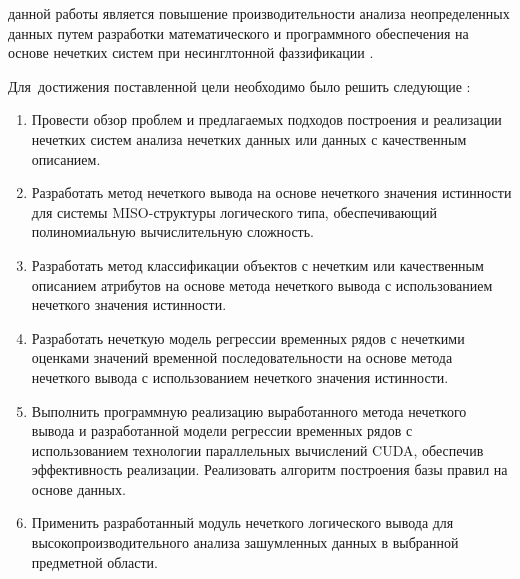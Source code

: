 \ifsynopsis
\else
\fi


{\aim} данной работы является повышение производительности анализа неопределенных данных путем разработки математического и программного обеспечения на основе нечетких систем при несинглтонной фаззификации .

Для~достижения поставленной цели необходимо было решить следующие {\tasks}:
\begin{enumerate}[beginpenalty=10000] %
  \item Провести обзор проблем и предлагаемых подходов построения и реализации нечетких систем анализа нечетких данных или данных с качественным описанием.
  \item Разработать метод нечеткого вывода на основе нечеткого значения истинности для системы MISO-структуры логического типа, обеспечивающий полиномиальную вычислительную сложность.
  \item Разработать метод классификации объектов с нечетким или качественным описанием атрибутов на основе метода нечеткого вывода с использованием нечеткого значения истинности.
  \item Разработать нечеткую модель регрессии временных рядов с нечеткими оценками значений временной последовательности на основе метода нечеткого вывода с использованием нечеткого значения истинности.
  \item Выполнить программную реализацию выработанного метода нечеткого вывода и разработанной модели регрессии временных рядов с использованием технологии параллельных вычислений CUDA, обеспечив эффективность реализации. Реализовать алгоритм построения базы правил на основе данных.
  \item Применить разработанный модуль нечеткого логического вывода для высокопроизводительного анализа зашумленных данных в выбранной предметной области.
\end{enumerate}

